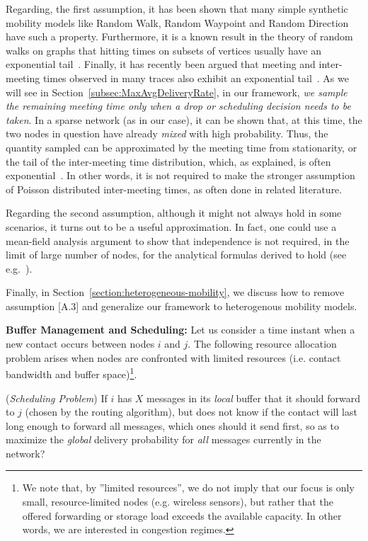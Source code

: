 Regarding, the first assumption, it has been shown that many simple synthetic mobility models like Random Walk, Random Waypoint and Random Direction~\cite{akis:mobihoc06,Inria:MessageDelay} have such a property. Furthermore, it is a known result in the theory of random walks on graphs that hitting times on subsets of vertices usually have an exponential tail~\cite{Aldous:book}. Finally, it has recently been argued that meeting and inter-meeting times observed in many traces also exhibit an exponential tail~\cite{LeBoudec:Mobicom07}. As we will see in Section~\ref{subsec:MaxAvgDeliveryRate}, in our framework, \emph{we sample the remaining meeting time only when a drop or scheduling decision needs to be taken}. In a sparse network (as in our case), it can be shown that, at this time, the two nodes in question have already \emph{mixed} with high probability. Thus, the quantity sampled can be approximated by the meeting time from stationarity, or the tail of the inter-meeting time distribution, which, as explained, is often exponential~\cite{Akis:IJAACS2008}. In other words, it is not required to make the stronger assumption of Poisson distributed inter-meeting times, as often done in related literature.

Regarding the second assumption, although it might not always hold in some scenarios, it turns out to be a useful approximation. In fact, one could use a mean-field analysis argument to show that independence is not required, in the limit of large number of nodes, for the analytical formulas derived to hold (see e.g.~\cite{LeBoudec:Sigmetrics09}).

Finally, in Section~\ref{section:heterogeneous-mobility}, we discuss how to remove assumption [A.3] and generalize our framework to heterogenous mobility models.

\textbf{Buffer Management and Scheduling:} Let us consider a time instant when a new contact occurs between nodes $i$ and $j$. The following resource allocation problem arises when nodes are confronted with limited resources (i.e. contact bandwidth and buffer space)\footnote{We note that, by ''limited resources'', we do not imply that our focus is only small, resource-limited nodes (e.g. wireless sensors), but rather that the offered forwarding or storage load exceeds the available capacity. In other words, we are interested in congestion regimes.}.

(\emph{Scheduling Problem}) If $i$ has $X$ messages in its \emph{local} buffer that it should forward to $j$ (chosen by the routing algorithm), but does not know if the contact will last long enough to forward all messages, which ones should it send first, so as to maximize the \emph{global} delivery probability for \emph{all} messages currently in the network?

